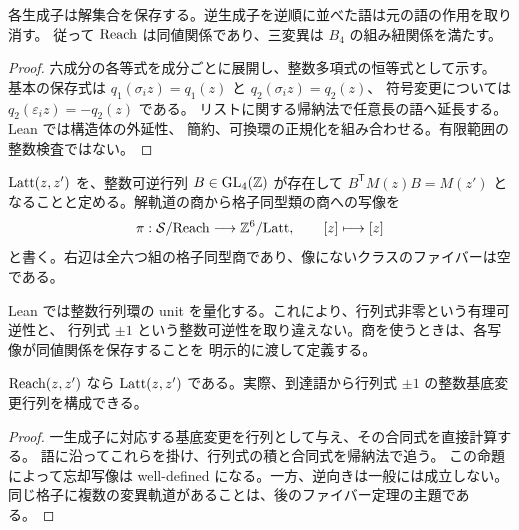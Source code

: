 \begin{lemma}[方程式の保存と可逆性]\label{bp:mutation-invariants}
\leanok
{}
各生成子は解集合を保存する。逆生成子を逆順に並べた語は元の語の作用を取り消す。
従って $\operatorname{Reach}$ は同値関係であり、三変異は $B_4$ の組み紐関係を満たす。
\end{lemma}
\begin{proof}\leanok{}
六成分の各等式を成分ごとに展開し、整数多項式の恒等式として示す。
基本の保存式は $q_1(\sigma_i z)=q_1(z)$ と $q_2(\sigma_i z)=q_2(z)$、
符号変更については $q_2(\varepsilon_i z)=-q_2(z)$ である。
リストに関する帰納法で任意長の語へ延長する。Lean では構造体の外延性、
簡約、可換環の正規化を組み合わせる。有限範囲の整数検査ではない。
\end{proof}

\begin{definition}\label{bp:def-lattice}
\leanok
{}
$\operatorname{Latt}(z,z')$ を、整数可逆行列 $B\in\operatorname{GL}_4(\mathbb Z)$ が存在して
$B^{\mathsf T}M(z)B=M(z')$ となることと定める。解軌道の商から格子同型類の商への写像を
\[
\pi:\mathcal S/{\operatorname{Reach}}\longrightarrow\mathbb Z^6/{\operatorname{Latt}},\qquad [z]\longmapsto[z]
\]
と書く。右辺は全六つ組の格子同型商であり、像にないクラスのファイバーは空である。
\end{definition}
Lean では整数行列環の unit を量化する。これにより、行列式非零という有理可逆性と、
行列式 $\pm1$ という整数可逆性を取り違えない。商を使うときは、各写像が同値関係を保存することを
明示的に渡して定義する。

\begin{proposition}[語から整数基底変更へ]\label{bp:basis-congruence}
\leanok
{}
$\operatorname{Reach}(z,z')$ なら $\operatorname{Latt}(z,z')$ である。実際、到達語から行列式 $\pm1$ の整数基底変更行列を構成できる。
\end{proposition}
\begin{proof}\leanok{}
一生成子に対応する基底変更を行列として与え、その合同式を直接計算する。
語に沿ってこれらを掛け、行列式の積と合同式を帰納法で追う。
この命題によって忘却写像は well-defined になる。一方、逆向きは一般には成立しない。
同じ格子に複数の変異軌道があることは、後のファイバー定理の主題である。
\end{proof}

